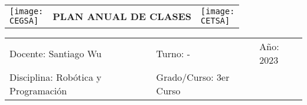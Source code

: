 \documentclass[landscape, a4paper, 10pt]{article}
\newcommand{\profesor}{Santiago Wu}
\newcommand{\discipline}{Robótica y Programación}
\newcommand{\currentyear}{2023}
\newcommand{\CEGSA}{cegsa-logo.png}
\newcommand{\CETSA}{cetsa-logo.png}
\begin{document}
	\pagebreak[4]
	\begin{tabularx}{\textwidth}{ >{\raggedright\arraybackslash}X >{\centering\arraybackslash}X >{\raggedleft\arraybackslash}X }
		\texttt{[image: \\CEGSA]} &
		\textbf{PLAN ANUAL DE CLASES} &
		\texttt{[image: \\CETSA]}
	\end{tabularx}
	\begin{tabularx}{\textwidth}{ >{\raggedright\arraybackslash}X >{\raggedright\arraybackslash}X >{\raggedright\arraybackslash}X }
		Docente: \profesor &
		Turno: - &
		Año: \currentyear \\
		Disciplina: \discipline &
		Grado/Curso: 3er Curso &
		 \\
	\end{tabularx}
	\centering
\end{document}
